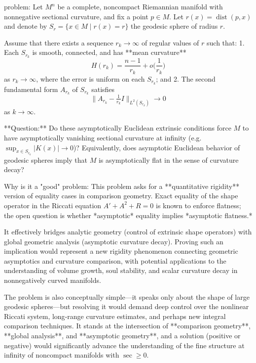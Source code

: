 problem:  
Let \(M^n\) be a complete, noncompact Riemannian manifold with nonnegative sectional curvature, and fix a point \(p \in M\).  
Let \(r(x) = \operatorname{dist}(p,x)\) and denote by \(S_r = \{x \in M \mid r(x)=r\}\) the geodesic sphere of radius \(r\).  

Assume that there exists a sequence \(r_k \to \infty\) of regular values of \(r\) such that:  
1. Each \(S_{r_k}\) is smooth, connected, and has **mean curvature**
   \[
   H(r_k) = \frac{n-1}{r_k} + o\Big(\frac{1}{r_k}\Big)
   \]
   as \(r_k \to \infty\), where the error is uniform on each \(S_{r_k}\); and  
2. The second fundamental form \(A_{r_k}\) of \(S_{r_k}\) satisfies
   \[
   \|A_{r_k} - \tfrac{1}{r_k}I\|_{L^2(S_{r_k})} \to 0
   \]
   as \(k\to\infty\).  

**Question:**  
Do these asymptotically Euclidean extrinsic conditions force \(M\) to have asymptotically vanishing sectional curvature at infinity (e.g. \(\sup_{x \in S_{r_k}} |K(x)| \to 0\))?  
Equivalently, does asymptotic Euclidean behavior of geodesic spheres imply that \(M\) is asymptotically flat in the sense of curvature decay?  

Why is it a "good" problem:  
This problem asks for a **quantitative rigidity** version of equality cases in comparison geometry. Exact equality of the shape operator in the Riccati equation \(A' + A^2 + R=0\) is known to enforce flatness; the open question is whether *asymptotic* equality implies *asymptotic flatness.*  

It effectively bridges analytic geometry (control of extrinsic shape operators) with global geometric analysis (asymptotic curvature decay). Proving such an implication would represent a new rigidity phenomenon connecting geometric asymptotics and curvature comparison, with potential applications to the understanding of volume growth, soul stability, and scalar curvature decay in nonnegatively curved manifolds.  

The problem is also conceptually simple—it speaks only about the shape of large geodesic spheres—but resolving it would demand deep control over the nonlinear Riccati system, long‐range curvature estimates, and perhaps new integral comparison techniques. It stands at the intersection of **comparison geometry**, **global analysis**, and **asymptotic geometry**, and a solution (positive or negative) would significantly advance the understanding of the fine structure at infinity of noncompact manifolds with \(\sec \ge 0\).
